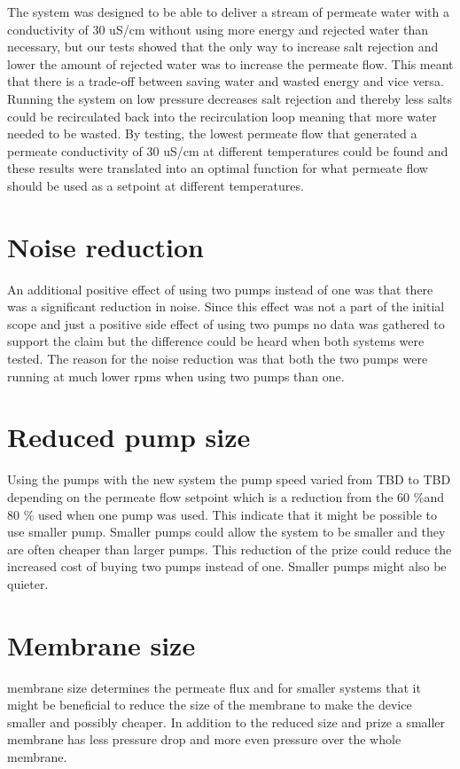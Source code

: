 The system was designed to be able to deliver a stream of permeate water with a conductivity of 30 uS/cm without using more energy and rejected water than necessary, but our tests showed that the only way to increase salt rejection and lower the amount of rejected water was to increase the permeate flow. This meant that there is a trade-off between saving water and wasted energy and vice versa. Running the system on low pressure decreases salt rejection and thereby less salts could be recirculated back into the recirculation loop meaning that more water needed to be wasted. By testing, the lowest permeate flow that generated a permeate conductivity of 30 uS/cm at different temperatures could be found and these results were translated into an optimal function for what permeate flow should be used as a setpoint at different temperatures. 

\section{Noise reduction}

An additional positive effect of using two pumps instead of one was that there was a significant reduction in noise. Since this effect was not a part of the initial scope and just a positive side effect of using two pumps no data was gathered to support the claim but the difference could be heard when both systems were tested. The reason for the noise reduction was that both the two pumps were running at much lower rpms when using two pumps than one. 

\section{Reduced pump size}
Using the pumps with the new system the pump speed varied from TBD to TBD depending on the permeate flow setpoint which is a reduction from the 60 \%and 80 \% used when one pump was used. This indicate that it might be possible to use smaller pump. Smaller pumps could allow the system to be smaller and they are often cheaper than larger pumps. This reduction of the prize could reduce the increased cost of buying two pumps instead of one. Smaller pumps might also be quieter.

\section{Membrane size}
membrane size determines the permeate flux and for smaller systems that it might be beneficial to reduce the size of the membrane to make the device smaller and possibly cheaper. In addition to the reduced size and prize a smaller membrane has less pressure drop and more even pressure over the whole membrane.

